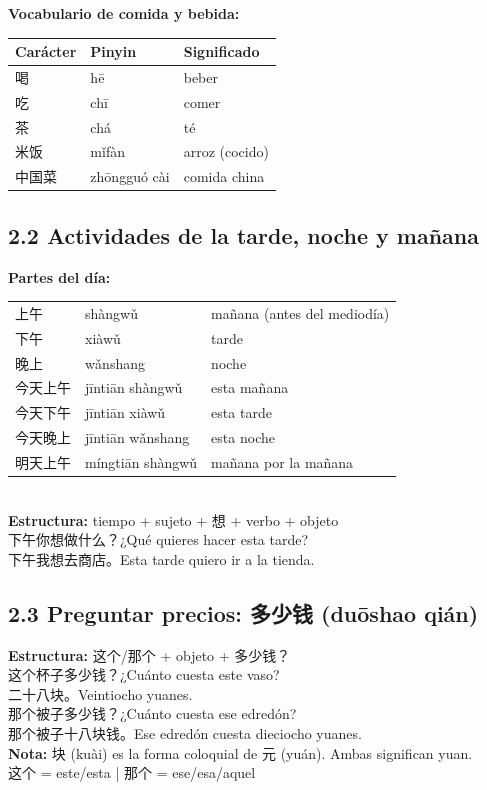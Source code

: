 \documentclass[12pt, a4paper]{article}
\begin{document}
\newpage

\noindent\textbf{Vocabulario de comida y bebida:}

\begin{center}
\begin{tabular}{lll}
\toprule
\textbf{Carácter} & \textbf{Pinyin} & \textbf{Significado} \\
\midrule
喝 & hē & beber \\
吃 & chī & comer \\
茶 & chá & té \\
米饭 & mǐfàn & arroz (cocido) \\
中国菜 & zhōngguó cài & comida china \\
\bottomrule
\end{tabular}
\end{center}

\subsection{2.2 Actividades de la tarde, noche y mañana}

\begin{cuadroazul}
\textbf{Partes del día:}\\[4pt]
\begin{tabular}{lll}
上午 & shàngwǔ & mañana (antes del mediodía) \\
下午 & xiàwǔ & tarde \\
晚上 & wǎnshang & noche \\
今天上午 & jīntiān shàngwǔ & esta mañana \\
今天下午 & jīntiān xiàwǔ & esta tarde \\
今天晚上 & jīntiān wǎnshang & esta noche \\
明天上午 & míngtiān shàngwǔ & mañana por la mañana \\
\end{tabular}\\[6pt]
\textbf{Estructura:} tiempo + sujeto + 想 + verbo + objeto\\
下午你想做什么？\quad ¿Qué quieres hacer esta tarde?\\
下午我想去商店。\quad Esta tarde quiero ir a la tienda.
\end{cuadroazul}

\subsection{2.3 Preguntar precios: 多少钱 (duōshao qián)}

\begin{cuadroazul}
\textbf{Estructura:} \quad 这个/那个 + objeto + 多少钱？\\[4pt]
这个杯子多少钱？\quad ¿Cuánto cuesta este vaso?\\
二十八块。\quad Veintiocho yuanes.\\
那个被子多少钱？\quad ¿Cuánto cuesta ese edredón?\\
那个被子十八块钱。\quad Ese edredón cuesta dieciocho yuanes.\\[4pt]
\textbf{Nota:} 块 (kuài) es la forma coloquial de 元 (yuán). Ambas significan yuan.\\
这个 = este/esta \quad | \quad 那个 = ese/esa/aquel
\end{cuadroazul}
\end{document}
